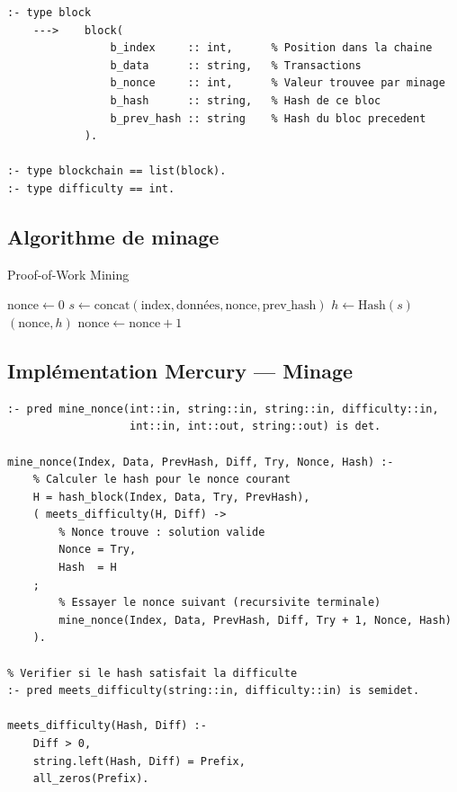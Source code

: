 \documentclass[12pt,a4paper]{article}
\begin{document}
\begin{lstlisting}[caption={Type bloc en Mercury}]
:- type block
    --->    block(
                b_index     :: int,      % Position dans la chaine
                b_data      :: string,   % Transactions
                b_nonce     :: int,      % Valeur trouvee par minage
                b_hash      :: string,   % Hash de ce bloc
                b_prev_hash :: string    % Hash du bloc precedent
            ).

:- type blockchain == list(block).
:- type difficulty == int.
\end{lstlisting}

\subsection{Algorithme de minage}

\begin{algorithmbox}{Proof-of-Work Mining}
\begin{algorithm}[H]
\caption{Minage d'un bloc}
\begin{algorithmic}[1]
  \State $\text{nonce} \gets 0$
  \Repeat
    \State $s \gets \text{concat}(\text{index}, \text{données},
           \text{nonce}, \text{prev\_hash})$
    \State $h \gets \text{Hash}(s)$
      \Return $(\text{nonce}, h)$
    \EndIf
    \State $\text{nonce} \gets \text{nonce} + 1$
\EndProcedure
\end{algorithmic}
\end{algorithm}
\end{algorithmbox}

\subsection{Implémentation Mercury — Minage}

\begin{lstlisting}[caption={Minage par recherche de nonce en Mercury}]
:- pred mine_nonce(int::in, string::in, string::in, difficulty::in,
                   int::in, int::out, string::out) is det.

mine_nonce(Index, Data, PrevHash, Diff, Try, Nonce, Hash) :-
    % Calculer le hash pour le nonce courant
    H = hash_block(Index, Data, Try, PrevHash),
    ( meets_difficulty(H, Diff) ->
        % Nonce trouve : solution valide
        Nonce = Try,
        Hash  = H
    ;
        % Essayer le nonce suivant (recursivite terminale)
        mine_nonce(Index, Data, PrevHash, Diff, Try + 1, Nonce, Hash)
    ).

% Verifier si le hash satisfait la difficulte
:- pred meets_difficulty(string::in, difficulty::in) is semidet.

meets_difficulty(Hash, Diff) :-
    Diff > 0,
    string.left(Hash, Diff) = Prefix,
    all_zeros(Prefix).
\end{lstlisting}
\end{document}
